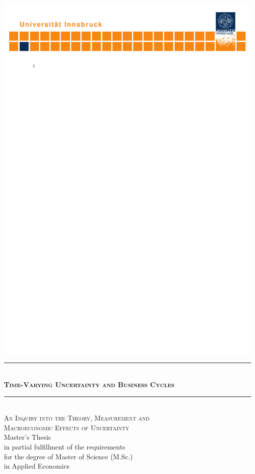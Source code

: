 \documentclass[a4paper,11pt,listof=nochaptergap,oneside,pointednumbers,bibtotoc,bigheadings,liststotoc]{scrbook}
\theoremstyle{mysatz}
\theoremstyle{mydefinition}
\theoremstyle{mybemerkung}
\begin{document}
\begin{titlepage}
    \begin{center}
        \hspace*{-0.27\textwidth}\includegraphics[width=1.419\textwidth, trim = 5mm 250mm 0mm 0mm, clip = TRUE]{logo.pdf}\hspace*{-0.3\textwidth}
        \quad \\[0mm]
        \newcommand{\HRule}{\rule{\linewidth}{0.3mm}} %
        \HRule \\[-1mm]
        \Huge{\scshape\bfseries Time-Varying Uncertainty and Business Cycles} \\[-5mm]
        \HRule \\[2mm]
        \Large {\scshape An Inquiry into the Theory, Measurement and \\
        				Macroeconomic Effects of Uncertainty} \\[10mm]
        \Large Master's Thesis \\[10mm]
        \Large in partial fulfillment of the requirements \\for the degree of Master of Science (M.Sc.)\\
                  in Applied Economics \\[10mm]
                  

\end{center}
\end{titlepage}
\end{document}
